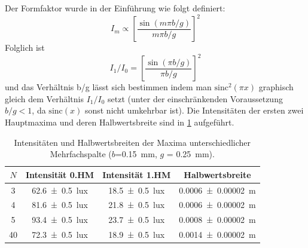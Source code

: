 \documentclass[
	a4paper,
	12pt,
	pagesize,
	ngerman
]{scrartcl}
\begin{document}
	

	
	Der Formfaktor wurde in der Einführung wie folgt definiert: 
	\begin{equation}
		I_m \propto \left[\frac{\sin(m\pi b/g)}{m\pi b/g}\right]^2
	\end{equation}
	Folglich ist
	\begin{equation}
		I_1/I_0 = \left[\frac{\sin(\pi b/g)}{\pi b/g}\right]^2
	\end{equation}
	und das Verhältnis b/g lässt sich bestimmen indem man $ \text{sinc}^2(\pi x)$ graphisch gleich dem Verhältnis $I_1/I_0$ setzt (unter der einschränkenden Voraussetzung $b/g<1$, da $\text{sinc}(x)$ sonst nicht umkehrbar ist).
	Die Intensitäten der ersten zwei Hauptmaxima und deren Halbwertsbreite sind in \cref{GitterTabelle} aufgeführt. 
	\begin{table}[H]
		\centering
		\begin{tabular}{ c | c | c | c }
			$N$ &  Intensität 0.HM & Intensität 1.HM & Halbwertsbreite\\ \hline
			3 & \SI{62,6 +- 0,5}{lux} & \SI{18,5 +- 0,5}{lux} & \SI{0,0006+- 0,00002}{m} \\
			4 & \SI{81,6 +- 0,5}{lux} & \SI{21,8 +- 0,5}{lux} & \SI{0,0006+- 0,00002}{m} \\
			5 & \SI{93,4 +- 0,5}{lux} & \SI{23,7 +- 0,5}{lux} & \SI{0,0008+- 0,00002}{m} \\
			40& \SI{72,3 +- 0,5}{lux} & \SI{18,9 +- 0,5}{lux} & \SI{0,0014+- 0,00002}{m} \\
		\end{tabular}
		\caption{Intensitäten und Halbwertsbreiten der Maxima unterschiedlicher Mehrfachspalte ($b$=\SI{0,15}{mm}, $g$ = \SI{0,25}{mm}).}
		\label{GitterTabelle} 
	\end{table}
	
\end{document}
